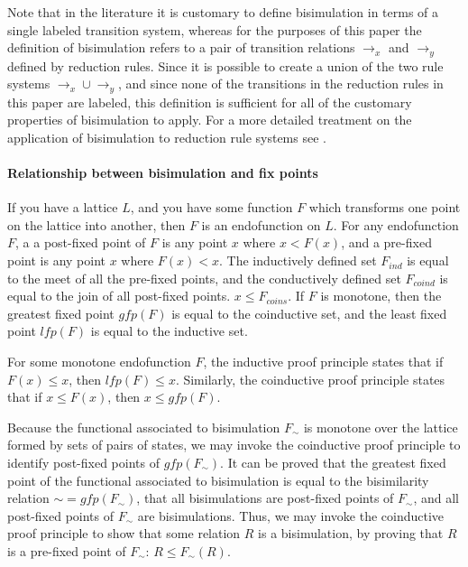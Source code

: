Note that in the literature it is customary to define bisimulation in
terms of a single labeled transition system, whereas for the purposes
of this paper the definition of bisimulation refers to a pair of
transition relations $\rightarrow_x$ and $\rightarrow_y$ defined by
reduction rules. Since it is possible to create a union of the two
rule systems $\rightarrow_x \cup \rightarrow_y$, and since none of the
transitions in the reduction rules in this paper are labeled, this
definition is sufficient for all of the customary properties of
bisimulation to apply. For a more detailed treatment on the
application of bisimulation to reduction rule systems see
\cite{GSE:barbedbisimulation}.

\paragraph{Relationship between bisimulation and fix points}

If you have a lattice $L$, and you have some 
function $F$ which transforms one point on the lattice into another, then
$F$ is an endofunction on $L$. For any endofunction $F$, a 
a post-fixed point of $F$ is any point $x$ where $x < F(x)$, and a pre-fixed 
point is any point $x$ where $F(x) < x$. The inductively defined set $F_\mathit{ind}$
is equal to the meet of all the pre-fixed points, and the conductively 
defined set $F_\mathit{coind}$ is equal to the join of all post-fixed points. 
$x \leq F_\mathit{coins}$. If $F$ is monotone, then the greatest fixed point $\mathit{gfp}(F)$ 
is equal to the coinductive set, and the least fixed point $\mathit{lfp}(F)$ is equal to the 
inductive set.

For some monotone endofunction $F$, the inductive proof principle states that 
if $F(x) \leq x$, then $\mathit{lfp}(F) \leq x$. Similarly, the coinductive proof 
principle states that if $x \leq F(x)$, then $x \leq \mathit{gfp}(F)$. 

Because the functional associated to bisimulation $F_\sim$ is monotone over 
the lattice formed by sets of pairs of states, we may invoke the coinductive proof principle
to identify post-fixed points of $\mathit{gfp}(F_\sim)$. It can be proved that
the greatest fixed point of the functional associated to 
bisimulation is equal to the bisimilarity relation $\sim = \mathit{gfp}(F_\sim)$, that 
all bisimulations are 
post-fixed points of $F_\sim$, and all post-fixed points of $F_\sim$ are 
bisimulations. Thus, we may invoke the coinductive proof principle to show that some relation $R$ is a bisimulation, by proving that $R$ is a pre-fixed point of $F_\sim$: $R \leq F_\sim(R)$.
 


